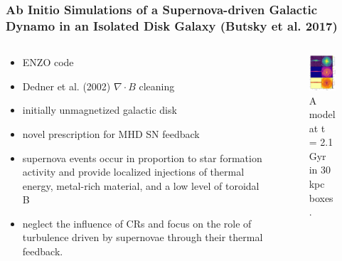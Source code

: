 \documentclass[10pt,aspectratio=169]{beamer}
\begin{document}
\begin{frame}
	\frametitle{Ab Initio Simulations of a Supernova-driven Galactic Dynamo in an Isolated Disk Galaxy (Butsky et al. 2017)}
		\begin{columns}
			\begin{column}{0.55\textwidth}
				\begin{itemize}
					\item ENZO code
					\item Dedner et al. (2002) $\nabla \cdot B$ cleaning
					\item initially unmagnetized galactic disk
					\item novel prescription for MHD SN feedback
					\item supernova events occur in proportion to star formation activity and provide localized injections of thermal energy, metal-rich material, and a low level of toroidal B
					\item neglect the influence of CRs and focus on the role of turbulence driven by supernovae through their thermal feedback.
				\end{itemize}
			\end{column}
			\begin{column}{0.48\textwidth}
			\begin{figure}
				\includegraphics[width=5cm]{./images/g80_lr.pdf}
				\caption{A model at t = 2.1	Gyr in 30 kpc boxes.}
			\end{figure}
			\end{column}
		\end{columns}
\end{frame}
\end{document}
